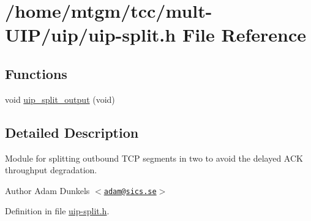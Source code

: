 \hypertarget{uip-split_8h}{
\section{/home/mtgm/tcc/mult-\/UIP/uip/uip-\/split.h File Reference}
\label{uip-split_8h}
}
\subsection*{Functions}
\begin{DoxyCompactItemize}
\item 
void \hyperlink{group__uipsplit_gab4b17aaf20d630f30919b19937b966a3}{uip\_\-split\_\-output} (void)
\end{DoxyCompactItemize}


\subsection{Detailed Description}
Module for splitting outbound TCP segments in two to avoid the delayed ACK throughput degradation. \begin{DoxyAuthor}{Author}
Adam Dunkels $<$\href{mailto:adam@sics.se}{\tt adam@sics.se}$>$ 
\end{DoxyAuthor}


Definition in file \hyperlink{uip-split_8h_source}{uip-\/split.h}.

